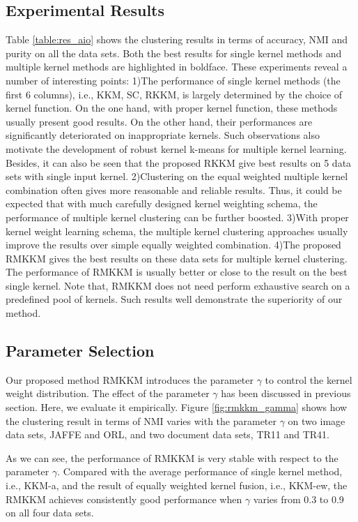 \documentclass{article}
\begin{document}
\subsection{Experimental Results}
Table \ref{table:res_aio} shows the clustering results in terms of accuracy, NMI and purity on all the data sets. Both the best results for single kernel methods and multiple kernel methods are highlighted in boldface. These experiments reveal a number of interesting points: 1)The performance of single kernel methods (the first 6 columns), i.e., KKM, SC, RKKM, is largely determined by the choice of kernel function. On the one hand, with proper kernel function, these methods usually present good results. On the other hand, their performances are significantly deteriorated on inappropriate kernels. Such observations also motivate the development of robust kernel k-means for multiple kernel learning. Besides, it can also be seen that the proposed RKKM give best results on 5 data sets with single input kernel. 2)Clustering on the equal weighted multiple kernel combination often gives more reasonable and reliable results. Thus, it could be expected that with much carefully designed kernel weighting schema, the performance of multiple kernel clustering can be further boosted. 3)With proper kernel weight learning schema, the multiple kernel clustering approaches usually improve the results over simple equally weighted combination. 4)The proposed RMKKM gives the best results on these data sets for multiple kernel clustering. The performance of RMKKM is usually better or close to the result on the best single kernel. Note that, RMKKM does not need perform exhaustive search on a predefined pool of kernels. Such results well demonstrate the superiority of our method.


\subsection{Parameter Selection}
Our proposed method RMKKM introduces the parameter $\gamma$ to control the kernel weight distribution. The effect of the parameter $\gamma$ has been discussed in previous section. Here, we evaluate it empirically. Figure \ref{fig:rmkkm_gamma} shows how the clustering result in terms of NMI varies with the parameter $\gamma$ on two image data sets, JAFFE and ORL, and two document data sets, TR11 and TR41.

As we can see, the performance of RMKKM is very stable with respect to the parameter $\gamma$. Compared with the average performance of single kernel method, i.e., KKM-a, and the result of equally weighted kernel fusion, i.e., KKM-ew, the RMKKM achieves consistently good performance when $\gamma$ varies from 0.3 to 0.9 on all four data sets.
\end{document}
